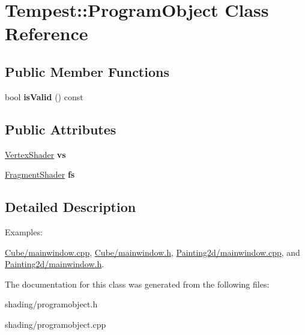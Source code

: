 \hypertarget{class_tempest_1_1_program_object}{\section{Tempest\+:\+:Program\+Object Class Reference}
\label{class_tempest_1_1_program_object}
}
\subsection*{Public Member Functions}
\begin{DoxyCompactItemize}
\item 
\hypertarget{class_tempest_1_1_program_object_ab88afcd7df8408deee896251fec20dba}{bool {\bfseries is\+Valid} () const }\label{class_tempest_1_1_program_object_ab88afcd7df8408deee896251fec20dba}

\end{DoxyCompactItemize}
\subsection*{Public Attributes}
\begin{DoxyCompactItemize}
\item 
\hypertarget{class_tempest_1_1_program_object_ab507f415dd7a35a7a1b8b9ba8566e92e}{\hyperlink{class_tempest_1_1_vertex_shader}{Vertex\+Shader} {\bfseries vs}}\label{class_tempest_1_1_program_object_ab507f415dd7a35a7a1b8b9ba8566e92e}

\item 
\hypertarget{class_tempest_1_1_program_object_a09b43a94b14eacc2cc41a0b6f5968213}{\hyperlink{class_tempest_1_1_fragment_shader}{Fragment\+Shader} {\bfseries fs}}\label{class_tempest_1_1_program_object_a09b43a94b14eacc2cc41a0b6f5968213}

\end{DoxyCompactItemize}


\subsection{Detailed Description}
\begin{Desc}
\item[Examples\+: ]\par
\hyperlink{_cube_2mainwindow_8cpp-example}{Cube/mainwindow.\+cpp}, \hyperlink{_cube_2mainwindow_8h-example}{Cube/mainwindow.\+h}, \hyperlink{_painting2d_2mainwindow_8cpp-example}{Painting2d/mainwindow.\+cpp}, and \hyperlink{_painting2d_2mainwindow_8h-example}{Painting2d/mainwindow.\+h}.\end{Desc}


The documentation for this class was generated from the following files\+:\begin{DoxyCompactItemize}
\item 
shading/programobject.\+h\item 
shading/programobject.\+cpp\end{DoxyCompactItemize}
